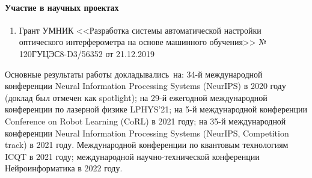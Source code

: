 \paragraph{Участие в научных проектах}
\begin{enumerate}[labelindent=3pt, labelsep=10pt, topsep=10pt, itemsep=5pt]
    \item Грант УМНИК <<Разработка системы автоматической настройки оптического интерферометра на основе машинного обучения>> № 120ГУЦЭС8-D3/56352 от 21.12.2019

\end{enumerate}
\else 

{\probation} Основные результаты работы докладывались~на: 34-й международной конференции Neural Information Processing Systems (NeurIPS) в 2020 году (доклад был отмечен как spotlight); на 29-й ежегодной международной конференции по лазерной физике LPHYS'21; на 5-й международной конференции Conference on Robot Learning (CoRL) в 2021 году; на 35-й международной конференции Neural Information Processing Systems (NeurIPS, Competition track) в 2021 году. Международной конференции по квантовым технологиям ICQT в 2021 году; международной научно-технической конференции Нейроинформатика в 2022 году.

